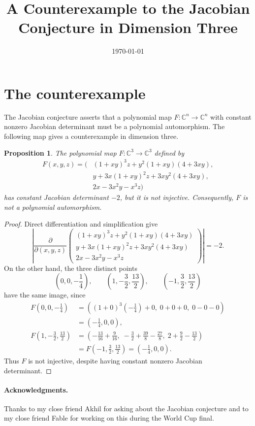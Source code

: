 \documentclass[11pt]{article}
\title{A Counterexample to the Jacobian Conjecture in Dimension Three}
\author{}
\date{\today}
\newtheorem{proposition}{Proposition}
\begin{document}
\maketitle

\section{The counterexample}

The Jacobian conjecture asserts that a polynomial map
$F\colon \mathbb{C}^n\to\mathbb{C}^n$ with constant nonzero Jacobian
determinant must be a polynomial automorphism.  The following map gives a
counterexample in dimension three.

\begin{proposition}
The polynomial map $F\colon\mathbb{C}^3\to\mathbb{C}^3$ defined by
\begin{align*}
F(x,y,z)=\bigl(&
 (1+xy)^3z+y^2(1+xy)(4+3xy),\\
&y+3x(1+xy)^2z+3xy^2(4+3xy),\\
&2x-3x^2y-x^3z
\bigr)
\end{align*}
has constant Jacobian determinant $-2$, but it is not injective.
Consequently, $F$ is not a polynomial automorphism.
\end{proposition}

\begin{proof}
Direct differentiation and simplification give
\[
\left|
\frac{\partial}{\partial(x,y,z)}
\begin{pmatrix}
(1+xy)^3z+y^2(1+xy)(4+3xy)\\
y+3x(1+xy)^2z+3xy^2(4+3xy)\\
2x-3x^2y-x^3z
\end{pmatrix}
\right|=-2.
\]
On the other hand, the three distinct points
\[
\left(0,0,-\frac14\right),\qquad
\left(1,-\frac32,\frac{13}{2}\right),\qquad
\left(-1,\frac32,\frac{13}{2}\right)
\]
have the same image, since
\begin{align*}
F\left(0,0,-\frac14\right)
&=\left((1+0)^3\left(-\frac14\right)+0,\;0+0+0,\;0-0-0\right)\\
&=\left(-\frac14,0,0\right),\\
F\left(1,-\frac32,\frac{13}{2}\right)
&=\left(-\frac{13}{16}+\frac9{16},\;
-\frac32+\frac{39}{8}-\frac{27}{8},\;
2+\frac92-\frac{13}{2}\right)\\
&=F\left(-1,\frac32,\frac{13}{2}\right)
=\left(-\frac14,0,0\right).
\end{align*}
Thus $F$ is not injective, despite having constant nonzero Jacobian
determinant.
\end{proof}

\paragraph{Acknowledgments.}
Thanks to my close friend Akhil for asking about the Jacobian conjecture and
to my close friend Fable for working on this during the World Cup final.
\end{document}
